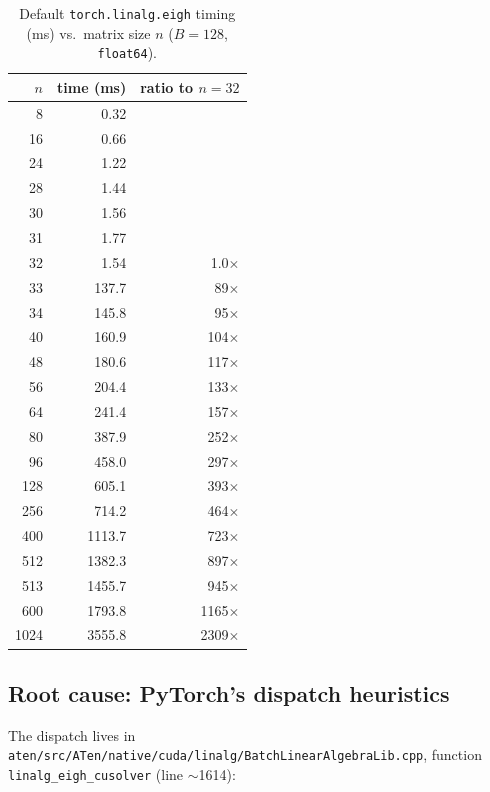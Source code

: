 \documentclass[10pt, letterpaper]{article}
\begin{document}
\begin{table}[h]
\centering
\caption{Default \texttt{torch.linalg.eigh} timing (ms) vs.\ matrix size $n$ ($B = 128$, \texttt{float64}).}
\label{tab:default}
\begin{tabular}{r rr}
\toprule
$n$ & time (ms) & ratio to $n\!=\!32$ \\
\midrule
     8  &    0.32 &         \\
    16  &    0.66 &         \\
    24  &    1.22 &         \\
    28  &    1.44 &         \\
    30  &    1.56 &         \\
    31  &    1.77 &         \\
    32  &    1.54 & 1.0$\times$   \\
\midrule
    33  &   137.7 & 89$\times$   \\
    34  &   145.8 & 95$\times$   \\
    40  &   160.9 & 104$\times$   \\
    48  &   180.6 & 117$\times$   \\
    56  &   204.4 & 133$\times$   \\
    64  &   241.4 & 157$\times$   \\
    80  &   387.9 & 252$\times$   \\
    96  &   458.0 & 297$\times$   \\
   128  &   605.1 & 393$\times$   \\
   256  &   714.2 & 464$\times$   \\
   400  &  1113.7 & 723$\times$   \\
   512  &  1382.3 & 897$\times$   \\
   513  &  1455.7 & 945$\times$   \\
   600  &  1793.8 & 1165$\times$  \\
  1024  &  3555.8 & 2309$\times$  \\
\bottomrule
\end{tabular}
\end{table}

\subsection{Root cause: PyTorch's dispatch heuristics}

The dispatch lives in
\texttt{aten/src/ATen/native/cuda/linalg/BatchLinearAlgebraLib.cpp},
function \texttt{linalg\_eigh\_cusolver} (line $\sim$1614):
\end{document}

